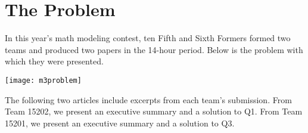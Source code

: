 \section*{The Problem}

In this year's math modeling contest, ten Fifth and Sixth Formers formed two teams and produced two papers in the 14-hour period. Below is the problem with which they were presented.

	\texttt{[image: m3problem]}
	
The following two articles include excerpts from each team's submission. From Team 15202, we present an executive summary and a solution to Q1. From Team 15201, we present an executive summary and a solution to Q3.
